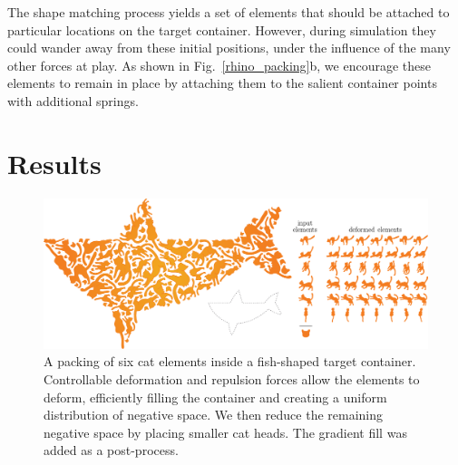 
\newtext
{
The shape matching process yields a set of elements that should be attached
to particular locations on the target container.  However, during simulation
they could wander away from these initial positions, under the influence of
the many other forces at play.  As shown in Fig.~\ref{rhino_packing}b, we
encourage these elements to remain in place by attaching them to the salient
container points with additional springs.
}

\section{Results}
\label{repulsionpak_results}

\begin{figure}
  \centering
  \includegraphics[width=1.0\textwidth]{figures/repulsionpak/cat_whale_04}
  \caption[A packing of a cat]
  {
  \label{cat_packing}
           A packing of six cat elements inside a fish-shaped target container. 
           Controllable deformation and repulsion forces allow the elements to deform,
           efficiently filling the container and creating a uniform distribution of
           negative space. We then reduce the remaining negative space by placing smaller
           cat heads. The gradient fill was added as a post-process.}
\end{figure}

